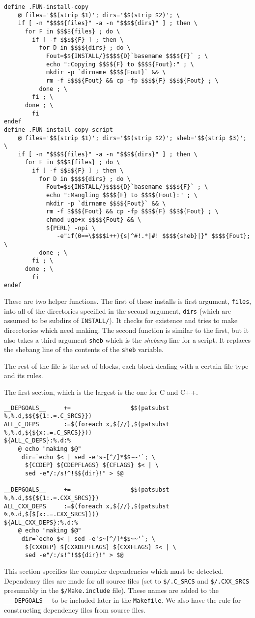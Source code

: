 \documentclass{article}
\begin{document}
\begin{verbatim}
define .FUN-install-copy
	@ files='$$(strip $1)'; dirs='$$(strip $2)'; \
	if [ -n "$$$${files}" -a -n "$$$${dirs}" ] ; then \
	  for F in $$$${files} ; do \
	    if [ -f $$$${F} ] ; then \
	      for D in $$$${dirs} ; do \
	        Fout=$${INSTALL/}$$$${D}`basename $$$${F}` ; \
	        echo ":Copying $$$${F} to $$$${Fout}:" ; \
	        mkdir -p `dirname $$$${Fout}` && \
	        rm -f $$$${Fout} && cp -fp $$$${F} $$$${Fout} ; \
	      done ; \
	    fi ; \
	  done ; \
        fi
endef
define .FUN-install-copy-script
	@ files='$$(strip $1)'; dirs='$$(strip $2)'; sheb='$$(strip $3)'; \
	if [ -n "$$$${files}" -a -n "$$$${dirs}" ] ; then \
	  for F in $$$${files} ; do \
	    if [ -f $$$${F} ] ; then \
	      for D in $$$${dirs} ; do \
	        Fout=$${INSTALL/}$$$${D}`basename $$$${F}` ; \
	        echo ":Mangling $$$${F} to $$$${Fout}:" ; \
	        mkdir -p `dirname $$$${Fout}` && \
	        rm -f $$$${Fout} && cp -fp $$$${F} $$$${Fout} ; \
	        chmod ugo+x $$$${Fout} && \
	        ${PERL} -npi \
	           -e"if(0==\$$$$i++){s|^#!.*|#! $$$${sheb}|}" $$$${Fout}; \
	      done ; \
	    fi ; \
	  done ; \
        fi
endef
\end{verbatim}
These are two helper functions.  The first of these installs is first
argument, \verb+files+, into all of the directories specified in the
second argument, \verb+dirs+ (which are assumed to be subdirs of
\verb+INSTALL/+).  It checks for existence and tries to make
direectories which need making.  The second function is similar to the
first, but it also takes a third argument \verb+sheb+ which is the
{\em shebang} line for a script.  It replaces the shebang line of the
contents of the \verb+sheb+ variable.

The rest of the file is the set of blocks, each block dealing with
a certain file type and its rules.

The first section, which is the largest is the one for C and C++.
\begin{verbatim}
__DEPGOALS__     +=                 $$(patsubst %,%.d,$${${1:.=.C_SRCS}})
ALL_C_DEPS       :=$(foreach x,${//},$(patsubst %,%.d,${${x:.=.C_SRCS}}))
${ALL_C_DEPS}:%.d:%
	@ echo "making $@"
	 dir=`echo $< | sed -e's~[^/]*$$~~'`; \
	  ${CCDEP} ${CDEPFLAGS} ${CFLAGS} $< | \
	  sed -e"/:/s!^!$${dir}!" > $@

__DEPGOALS__     +=                 $$(patsubst %,%.d,$${${1:.=.CXX_SRCS}})
ALL_CXX_DEPS     :=$(foreach x,${//},$(patsubst %,%.d,${${x:.=.CXX_SRCS}}))
${ALL_CXX_DEPS}:%.d:%
	@ echo "making $@"
	 dir=`echo $< | sed -e's~[^/]*$$~~'`; \
	  ${CXXDEP} ${CXXDEPFLAGS} ${CXXFLAGS} $< | \
	  sed -e"/:/s!^!$${dir}!" > $@
\end{verbatim}
This section specifies the compiler dependencies which must be
detected.  Dependency files are made for all source files
(set to \verb+$/.C_SRCS+ and \verb+$/.CXX_SRCS+ presumably in
the \verb+$/Make.include+ file).  These
names are added to the \verb+___DEPGOALS__+ to be included later
in the \verb+Makefile+.  We also have the rule for constructing
dependency files from source files.
\end{document}
